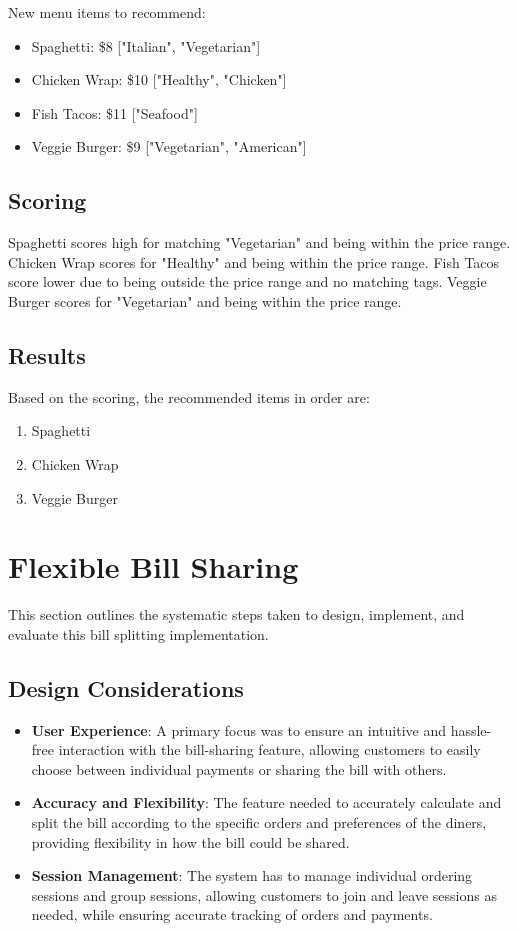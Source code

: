 New menu items to recommend:
\begin{itemize}
    \item Spaghetti: \$8 ["Italian", "Vegetarian"]
    \item Chicken Wrap: \$10 ["Healthy", "Chicken"]
    \item Fish Tacos: \$11 ["Seafood"]
    \item Veggie Burger: \$9 ["Vegetarian", "American"]
\end{itemize}

\subsection*{Scoring}

Spaghetti scores high for matching "Vegetarian" and being within the price range.
Chicken Wrap scores for "Healthy" and being within the price range.
Fish Tacos score lower due to being outside the price range and no matching tags.
Veggie Burger scores for "Vegetarian" and being within the price range.


\subsection*{Results}

Based on the scoring, the recommended items in order are:
\begin{enumerate}
    \item Spaghetti
    \item Chicken Wrap
    \item Veggie Burger
\end{enumerate}

\section{Flexible Bill Sharing}

This section outlines the systematic steps taken to design, implement, and evaluate this bill splitting implementation.

\subsection{Design Considerations}

\begin{itemize}
    \item \textbf{User Experience}: A primary focus was to ensure an intuitive and hassle-free interaction with the bill-sharing feature, allowing customers to easily choose between individual payments or sharing the bill with others.
    \item \textbf{Accuracy and Flexibility}: The feature needed to accurately calculate and split the bill according to the specific orders and preferences of the diners, providing flexibility in how the bill could be shared.
    \item \textbf{Session Management}: The system has to manage individual ordering sessions and group sessions, allowing customers to join and leave sessions as needed, while ensuring accurate tracking of orders and payments.
\end{itemize}

